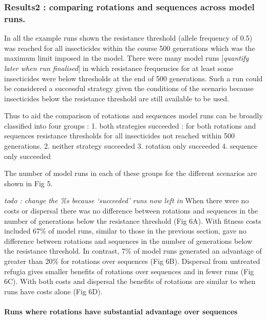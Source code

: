 \documentclass[11pt,]{article}
\let\oldparagraph\paragraph
\renewcommand{\paragraph}[1]{\oldparagraph{#1}\mbox{}}
\begin{document}
\subsubsection{Results2 : comparing rotations and sequences across model
runs.}\label{results2-comparing-rotations-and-sequences-across-model-runs.}

In all the example runs shown the resistance threshold (allele frequency
of 0.5) was reached for all insecticides within the course 500
generations which was the maximum limit imposed in the model. There were
many model runs {[}\emph{quantify later when run finalised}{]} in which
resistance frequencies for at least some insecticides were below
thresholds at the end of 500 generations. Such a run could be considered
a successful strategy given the conditions of the scenario because
insecticides below the resistance threshold are still available to be
used.

Thus to aid the comparison of rotations and sequences model runs can be
broadly classified into four groups : 1. both strategies succeeded : for
both rotations and sequences resistance thresholds for all insecticides
not reached within 500 generations. 2. neither strategy succeeded 3.
rotation only succeeded 4. sequence only succeeded

The number of model runs in each of these groups for the different
scenarios are shown in Fig 5.

\emph{todo : change the \%s because `succeeded' runs now left in} When
there were no costs or dispersal there was no difference between
rotations and sequences in the number of generations below the
resistance threshold (Fig 6A). With fitness costs included 67\% of model
runs, similar to those in the previous section, gave no difference
between rotations and sequences in the number of generations below the
resistance threshold. In contrast, 7\% of model runs generated an
advantage of greater than 20\% for rotations over sequences (Fig 6B).
Dispersal from untreated refugia gives smaller benefits of rotations
over sequences and in fewer runs (Fig 6C). With both costs and dispersal
the benefits of rotations are similar to when runs have costs alone (Fig
6D).

\paragraph{Runs where rotations have substantial advantage over
sequences}\label{runs-where-rotations-have-substantial-advantage-over-sequences}
\end{document}
